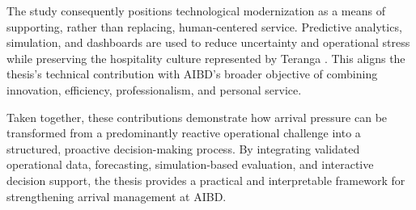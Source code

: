 The study consequently positions technological modernization as a means of supporting, rather than replacing, human-centered service. Predictive analytics, simulation, and dashboards are used to reduce uncertainty and operational stress while preserving the hospitality culture represented by Teranga \parencite{demir2025speaker}. This aligns the thesis's technical contribution with AIBD's broader objective of combining innovation, efficiency, professionalism, and personal service.

Taken together, these contributions demonstrate how arrival pressure can be transformed from a predominantly reactive operational challenge into a structured, proactive decision-making process. By integrating validated operational data, forecasting, simulation-based evaluation, and interactive decision support, the thesis provides a practical and interpretable framework for strengthening arrival management at AIBD.